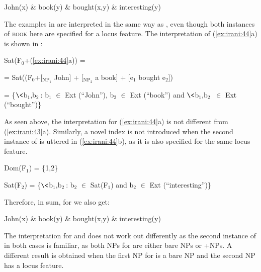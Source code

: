 \documentclass[output=paper,
modfonts
]{langscibook}
\begin{document}
\begin{exe}
\ex\label{ex:irani:50} John(x) \& book(y) \& bought(x,y) \& interesting(y)
\end{exe}


The examples in  are interpreted in the same way as , even though both instances of \textsc{book} here are specified for a locus feature. The interpretation of (\ref{ex:irani:44}a) is shown in :

\begin{exe}
  
\ex\label{ex:irani:51} Sat(F$_0$+(\ref{ex:irani:44}a)) = \par 
= Sat((F$_0$+[$_{\text{NP}_{1}}$ John] + [$_{\text{NP}_{2}}$ a book] + [e$_1$ bought e$_2$])\par 
= \{$\<$b$_1$,b$_2\>$: b$_1$ \(\in\) Ext (``John''), b$_2$ \(\in\) Ext (``book'') and $\<$b$_1$,b$_2\>$ \(\in\) Ext (``bought'')\} \par 

\end{exe}


As seen above, the interpretation for (\ref{ex:irani:44}a) is not different from (\ref{ex:irani:43}a). Similarly, a novel index is not introduced when the second instance of  is uttered in (\ref{ex:irani:44}b), as it is also specified for the same locus feature.  

\begin{exe}

\ex Dom(F$_1$) = \{1,2\} \par 
Sat(F$_2$) = \{$\<$b$_1$,b$_2\>$: b$_2$ \(\in\) Sat(F$_1$) and b$_2$ \(\in\) Ext (``interesting'')\} \par 

\end{exe}

Therefore, in sum, for  we also get: 

\begin{exe}

\ex John(x) \& book(y) \& bought(x,y) \& interesting(y)

\end{exe}

The interpretation for  and  does not work out differently as the second instance of  in both cases is familiar, as both NPs for  are either bare NPs or +NPs. A different result is obtained when the first NP for  is a bare NP and the second NP has a locus feature. 
\end{document}
